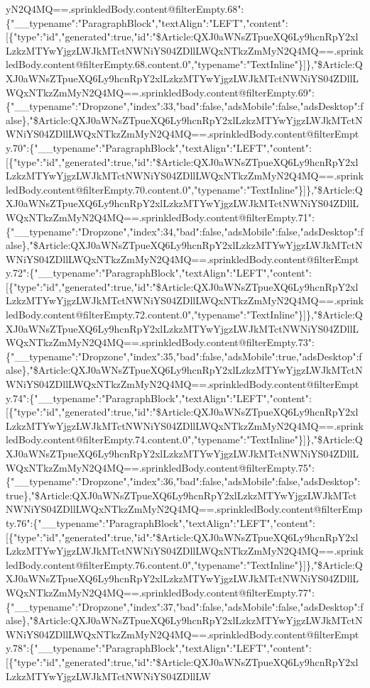yN2Q4MQ==.sprinkledBody.content@filterEmpty.68":\{"\_\_typename":"ParagraphBlock","textAlign":"LEFT","content":{[}\{"type":"id","generated":true,"id":"\$Article:QXJ0aWNsZTpueXQ6Ly9hcnRpY2xlLzkzMTYwYjgzLWJkMTctNWNiYS04ZDllLWQxNTkzZmMyN2Q4MQ==.sprinkledBody.content@filterEmpty.68.content.0","typename":"TextInline"\}{]}\},"\$Article:QXJ0aWNsZTpueXQ6Ly9hcnRpY2xlLzkzMTYwYjgzLWJkMTctNWNiYS04ZDllLWQxNTkzZmMyN2Q4MQ==.sprinkledBody.content@filterEmpty.69":\{"\_\_typename":"Dropzone","index":33,"bad":false,"adsMobile":false,"adsDesktop":false\},"\$Article:QXJ0aWNsZTpueXQ6Ly9hcnRpY2xlLzkzMTYwYjgzLWJkMTctNWNiYS04ZDllLWQxNTkzZmMyN2Q4MQ==.sprinkledBody.content@filterEmpty.70":\{"\_\_typename":"ParagraphBlock","textAlign":"LEFT","content":{[}\{"type":"id","generated":true,"id":"\$Article:QXJ0aWNsZTpueXQ6Ly9hcnRpY2xlLzkzMTYwYjgzLWJkMTctNWNiYS04ZDllLWQxNTkzZmMyN2Q4MQ==.sprinkledBody.content@filterEmpty.70.content.0","typename":"TextInline"\}{]}\},"\$Article:QXJ0aWNsZTpueXQ6Ly9hcnRpY2xlLzkzMTYwYjgzLWJkMTctNWNiYS04ZDllLWQxNTkzZmMyN2Q4MQ==.sprinkledBody.content@filterEmpty.71":\{"\_\_typename":"Dropzone","index":34,"bad":false,"adsMobile":false,"adsDesktop":false\},"\$Article:QXJ0aWNsZTpueXQ6Ly9hcnRpY2xlLzkzMTYwYjgzLWJkMTctNWNiYS04ZDllLWQxNTkzZmMyN2Q4MQ==.sprinkledBody.content@filterEmpty.72":\{"\_\_typename":"ParagraphBlock","textAlign":"LEFT","content":{[}\{"type":"id","generated":true,"id":"\$Article:QXJ0aWNsZTpueXQ6Ly9hcnRpY2xlLzkzMTYwYjgzLWJkMTctNWNiYS04ZDllLWQxNTkzZmMyN2Q4MQ==.sprinkledBody.content@filterEmpty.72.content.0","typename":"TextInline"\}{]}\},"\$Article:QXJ0aWNsZTpueXQ6Ly9hcnRpY2xlLzkzMTYwYjgzLWJkMTctNWNiYS04ZDllLWQxNTkzZmMyN2Q4MQ==.sprinkledBody.content@filterEmpty.73":\{"\_\_typename":"Dropzone","index":35,"bad":false,"adsMobile":true,"adsDesktop":false\},"\$Article:QXJ0aWNsZTpueXQ6Ly9hcnRpY2xlLzkzMTYwYjgzLWJkMTctNWNiYS04ZDllLWQxNTkzZmMyN2Q4MQ==.sprinkledBody.content@filterEmpty.74":\{"\_\_typename":"ParagraphBlock","textAlign":"LEFT","content":{[}\{"type":"id","generated":true,"id":"\$Article:QXJ0aWNsZTpueXQ6Ly9hcnRpY2xlLzkzMTYwYjgzLWJkMTctNWNiYS04ZDllLWQxNTkzZmMyN2Q4MQ==.sprinkledBody.content@filterEmpty.74.content.0","typename":"TextInline"\}{]}\},"\$Article:QXJ0aWNsZTpueXQ6Ly9hcnRpY2xlLzkzMTYwYjgzLWJkMTctNWNiYS04ZDllLWQxNTkzZmMyN2Q4MQ==.sprinkledBody.content@filterEmpty.75":\{"\_\_typename":"Dropzone","index":36,"bad":false,"adsMobile":false,"adsDesktop":true\},"\$Article:QXJ0aWNsZTpueXQ6Ly9hcnRpY2xlLzkzMTYwYjgzLWJkMTctNWNiYS04ZDllLWQxNTkzZmMyN2Q4MQ==.sprinkledBody.content@filterEmpty.76":\{"\_\_typename":"ParagraphBlock","textAlign":"LEFT","content":{[}\{"type":"id","generated":true,"id":"\$Article:QXJ0aWNsZTpueXQ6Ly9hcnRpY2xlLzkzMTYwYjgzLWJkMTctNWNiYS04ZDllLWQxNTkzZmMyN2Q4MQ==.sprinkledBody.content@filterEmpty.76.content.0","typename":"TextInline"\}{]}\},"\$Article:QXJ0aWNsZTpueXQ6Ly9hcnRpY2xlLzkzMTYwYjgzLWJkMTctNWNiYS04ZDllLWQxNTkzZmMyN2Q4MQ==.sprinkledBody.content@filterEmpty.77":\{"\_\_typename":"Dropzone","index":37,"bad":false,"adsMobile":false,"adsDesktop":false\},"\$Article:QXJ0aWNsZTpueXQ6Ly9hcnRpY2xlLzkzMTYwYjgzLWJkMTctNWNiYS04ZDllLWQxNTkzZmMyN2Q4MQ==.sprinkledBody.content@filterEmpty.78":\{"\_\_typename":"ParagraphBlock","textAlign":"LEFT","content":{[}\{"type":"id","generated":true,"id":"\$Article:QXJ0aWNsZTpueXQ6Ly9hcnRpY2xlLzkzMTYwYjgzLWJkMTctNWNiYS04ZDllLW